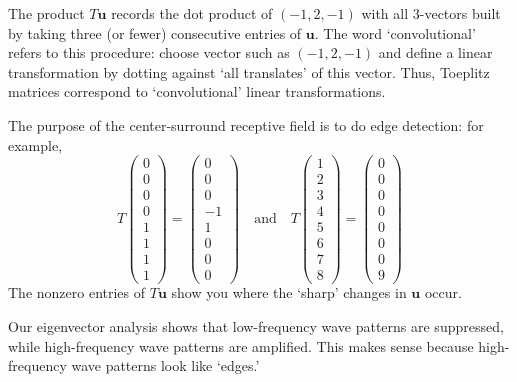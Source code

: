 \documentclass[10pt]{amsart}
\theoremstyle{mythm}
\theoremstyle{definition}
\theoremstyle{myrmk}
\begin{document}
\begin{itemize}
		The product $T\bm{u}$ records the dot product of $(-1, 2, -1)$ with all $3$-vectors built by taking three (or fewer) consecutive entries of $\bm{u}$. The word `convolutional' refers to this procedure: choose vector such as $(-1, 2, -1)$ and define a linear transformation by dotting against `all translates' of this vector. Thus, Toeplitz matrices correspond to `convolutional' linear transformations. 
		
		The purpose of the center-surround receptive field is to do edge detection: for example, 
		\[
			T \begin{pmatrix}
			0 \\ 0 \\ 0 \\ 0 \\ 1 \\ 1 \\ 1 \\ 1
			\end{pmatrix} = \begin{pmatrix}
			0 \\ 0 \\ 0 \\ -1 \\ 1 \\ 0 \\ 0 \\ 0
			\end{pmatrix} \quad \text{and} \quad T \begin{pmatrix}
			1 \\ 2 \\ 3 \\ 4 \\ 5 \\ 6 \\ 7 \\ 8
			\end{pmatrix} = \begin{pmatrix}
			0 \\ 0 \\ 0 \\ 0 \\ 0 \\ 0 \\ 0 \\ 9 
			\end{pmatrix}
		\]
		The nonzero entries of $T\bm{u}$ show you where the `sharp' changes in $\bm{u}$ occur. 
		
		Our eigenvector analysis shows that low-frequency wave patterns are suppressed, while high-frequency wave patterns are amplified. This makes sense because high-frequency wave patterns look like `edges.' 
	\end{itemize}
	
	
	
	
	
	
	
\end{document}
